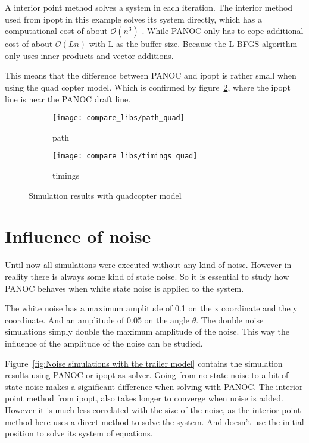A interior point method solves a system in each iteration. The interior method used from ipopt in this example solves its system directly, which has a computational cost of about $\mathcal{O}(n^3)$ . While PANOC only has to cope additional cost of about $\mathcal{O}(Ln)$ with L as the buffer size.  Because the L-BFGS algorithm only uses inner products and vector additions.

This means that the difference between PANOC and ipopt is rather small when using the quad copter model. Which is confirmed by figure~\ref{fig:timings trailer quad}, where the ipopt line is near the PANOC draft line.
\begin{figure}[H]
	\centering
	\begin{subfigure}[b]{0.45\textwidth}
		\centering
		\texttt{[image: compare\_libs/path\_quad]}
		\caption{path}
		\label{fig:solution path trailer quad}
	\end{subfigure}
	\hfill
	\begin{subfigure}[b]{0.45\textwidth}
		\centering
		\texttt{[image: compare\_libs/timings\_quad]}
		\caption{timings}
		\label{fig:timings trailer quad}
	\end{subfigure}
	\caption{Simulation results with quadcopter model}
	\label{fig:Simulation results with quadcopter}
\end{figure}

\section{Influence of noise}
Until now all simulations were executed without any kind of noise. However in reality there is always some kind of state noise. So it is essential to study how PANOC behaves when white state noise is applied to the system.

The white noise has a maximum amplitude of 0.1 on the x coordinate and the y coordinate. And an amplitude of 0.05 on the angle $\theta$. The double noise simulations simply double the maximum amplitude of the noise. This way the influence of the amplitude of the noise can be studied.

Figure~\ref{fig:Noise simulations with the trailer model} contains the simulation results using PANOC or ipopt as solver. Going from no state noise to a bit of state noise makes a significant difference when solving with PANOC. The interior point method from ipopt, also takes longer to converge when noise is added. However it is much less correlated with the size of the noise, as the interior point method here uses a direct method to solve the system. And doesn't use the initial position to solve its system of equations. 


